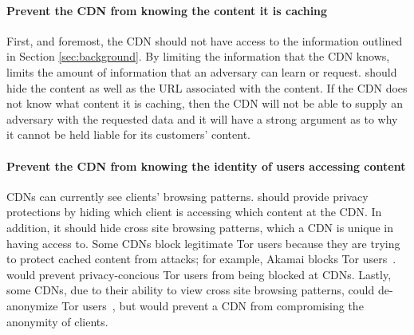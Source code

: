 
\paragraph{Prevent the CDN from knowing the content it is caching} First, and foremost, the CDN 
should not have access to the information outlined 
in Section \ref{sec:background}.  By limiting the information that the CDN knows, \system{} limits 
the amount of information that an adversary can learn or request.  \system{} should hide 
the content as well as the URL associated with the content.  If the CDN 
does not know what content it is caching, then the CDN will not be able to supply an adversary 
with the requested data and it will have a strong argument as to why it cannot be held 
liable for its customers' content.

\paragraph{Prevent the CDN from knowing the identity of users accessing content} CDNs can currently see clients' 
browsing patterns. \system{} should provide privacy protections by hiding which client is accessing 
which content at the CDN.  In addition, it should hide cross site browsing patterns, which a CDN 
is unique in having access to.  Some CDNs block legitimate Tor users because they are 
trying to protect cached content from attacks; for example, Akamai blocks Tor users~\cite{khattak2016you}.    \system{} would prevent 
privacy-concious Tor users from being blocked at CDNs.  Lastly, some CDNs, due to their ability 
to view cross site browsing patterns, could de-anonymize Tor users~\cite{cloudflare_tor}, but \system{} would 
prevent a CDN from compromising the anonymity of clients.

